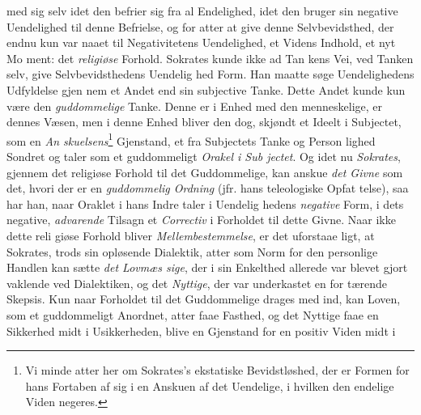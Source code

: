 med sig selv idet den befrier sig fra al Endelighed, idet den
bruger sin negative Uendelighed til denne Befrielse, og for
atter at give denne Selvbevidsthed, der endnu kun var naaet
til Negativitetens Uendelighed, et Videns Indhold, et nyt Mo\-%
ment: det \emph{religiøse} Forhold. Sokrates kunde ikke ad Tan\-%
kens Vei, ved Tanken selv, give Selvbevidsthedens Uendelig\-%
hed Form. Han maatte søge Uendelighedens Udfyldelse gjen\-%
nem et Andet end sin subjective Tanke. Dette Andet kunde
kun være den \emph{guddommelige} Tanke. Denne er i Enhed
med den menneskelige, er dennes Væsen, men i denne Enhed
 \setcounter{footnote}{0}%
bliver den dog, skjøndt et Ideelt i Subjectet, som en \emph{An\-%
skuelsens}\footnote{Vi minde atter her om Sokrates's ekstatiske
Bevidstløshed, der er Formen for hans Fortaben af sig i en Anskuen af
det Uendelige, i hvilken den endelige Viden negeres.} Gjenstand, et fra Subjectets Tanke og Person\-%
lighed Sondret og taler som et guddommeligt \emph{Orakel i Sub\-%
jectet}. Og idet nu \emph{Sokrates}, gjennem det religiøse Forhold
til det Guddommelige, kan anskue \emph{det Givne} som det, hvori
der er en \emph{guddommelig Ordning} (jfr. hans teleologiske Opfat\-%
telse), saa har han, naar Oraklet i hans Indre taler i Uendelig\-%
hedens \emph{negative} Form, i dets negative, \emph{advarende} Tilsagn et
\emph{Correctiv} i Forholdet til dette Givne. Naar ikke dette reli\-%
giøse Forhold bliver \emph{Mellembestemmelse}, er det uforstaae\-%
ligt, at Sokrates, trods sin opløsende Dialektik, atter som
Norm for den personlige Handlen kan sætte \emph{det Lovmæs\-%
sige}, der i sin Enkelthed allerede var blevet gjort vaklende
ved Dialektiken, og det \emph{Nyttige}, der var underkastet en for\-%
tærende Skepsis. Kun naar Forholdet til det Guddommelige
drages med ind, kan Loven, som et guddommeligt Anordnet,
atter faae Fasthed, og det Nyttige faae en Sikkerhed midt i
Usikkerheden, blive en Gjenstand for en positiv Viden midt i
